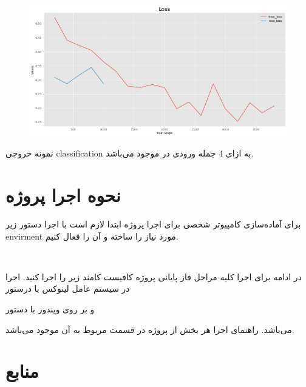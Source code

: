 \documentclass[10pt]{article}
\begin{document}
\begin{figure}[ht!]
	\centering\includegraphics[width=\linewidth]{../reports/loss_history_Bert.png}
	\caption{ 
		}
	\label{bert}
\end{figure}

نمونه خروجی classification به ازای 4 جمله ورودی در
موجود می‌باشد.
\newpage

\section{ نحوه اجرا پروژه}


برای آماده‌سازی کامپیوتر شخصی برای اجرا پروژه ابتدا لازم است با اجرا دستور زیر envirment مورد نیاز را ساخته و آن را فعال کنیم.

\begin{flushleft}
	\\
\end{flushleft}

در ادامه برای اجرا کلیه مراحل فاز پایانی پروژه کافیست کامند زیر را اجرا کنید.
اجرا در سیستم عامل لینوکس با درستور
\begin{flushleft}
\end{flushleft}

و بر روی ویندوز با دستور
\begin{flushleft}
\end{flushleft}

می‌باشد. راهنمای اجرا هر بخش از پروژه در قسمت مربوط به آن موجود می‌باشد.

\newpage

\section{منابع}
\end{document}
